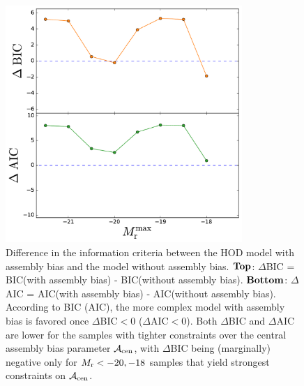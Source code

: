 \documentclass[12pt, preprint]{aastex}
\newcommand{\acen}{\mathcal{A}_{\rm cen}}
\begin{document}
\begin{figure}[p]~\\
\begin{center}
\includegraphics[width=0.8\textwidth]{IC.pdf}
\caption{Difference in the information criteria between the HOD model with assembly bias and the model without assembly bias. $\bf{Top}$: $\Delta$BIC = BIC(with assembly bias) - BIC(without assembly bias). $\bf{Bottom}$: $\Delta$AIC = AIC(with assembly bias) - AIC(without assembly bias). According to BIC (AIC), the more complex model with assembly bias is favored once $\Delta$BIC$<0$ ($\Delta$AIC$<0$). Both $\Delta$BIC and $\Delta$AIC are lower for the samples with tighter constraints over the central assembly bias parameter $\acen$, with $\Delta$BIC being (marginally) negative only for $M_{\rm r}<-20,-18$ samples that yield strongest constraints on $\acen$.} 
\label{fig:ic}
\end{center}
\end{figure}

\clearpage
\end{document}
